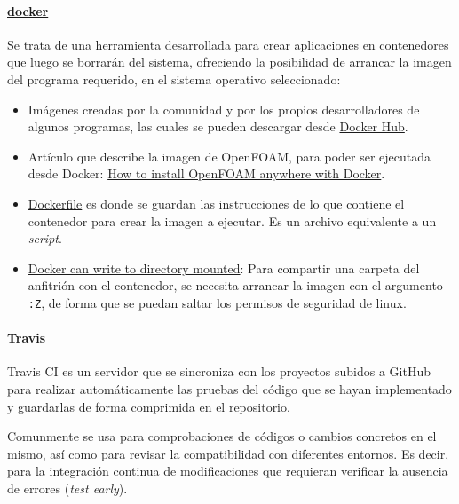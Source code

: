 \paragraph{\texorpdfstring{
\href{https://www.docker.com/}{docker}}{docker}}\label{header-n397}

Se trata de una herramienta desarrollada para crear aplicaciones en
contenedores que luego se borrarán del sistema, ofreciendo la
posibilidad de arrancar la imagen del programa requerido, en el sistema
operativo seleccionado:\\

\begin{itemize}
\item
  Imágenes creadas por la comunidad y por los propios desarrolladores de
  algunos programas, las cuales se pueden descargar desde
  \href{https://hub.docker.com}{Docker Hub}.
\item
  Artículo que describe la imagen de OpenFOAM, para poder ser ejecutada
  desde Docker:
  \href{https://www.cfdengine.com/blog/how-to-install-openfoam-anywhere-with-docker/}{How
  to install OpenFOAM anywhere with Docker}.
\item
  \href{https://hub.docker.com/r/quantumhpc/openfoam/~/dockerfile/}{Dockerfile}
  es donde se guardan las instrucciones de lo que contiene el contenedor
  para crear la imagen a ejecutar. Es un archivo equivalente a un
  \emph{script}.
\item
  \href{http://stackoverflow.com/questions/32001523/docker-cant-write-to-directory-mounted-using-v-unless-it-has-777-permissions}{Docker
  can write to directory mounted}: Para compartir una carpeta del
  anfitrión con el contenedor, se necesita arrancar la imagen con el
  argumento \texttt{:Z}, de forma que se puedan saltar los permisos de
  seguridad de linux.
\end{itemize}

\paragraph{Travis}\label{header-n414}

Travis CI es un servidor que se sincroniza con los proyectos subidos a
GitHub para realizar automáticamente las pruebas del código que se hayan
implementado y guardarlas de forma comprimida en el repositorio.

Comunmente se usa para comprobaciones de códigos o cambios concretos en
el mismo, así como para revisar la compatibilidad con diferentes
entornos. Es decir, para la integración continua de modificaciones que
requieran verificar la ausencia de errores (\emph{test early}).

